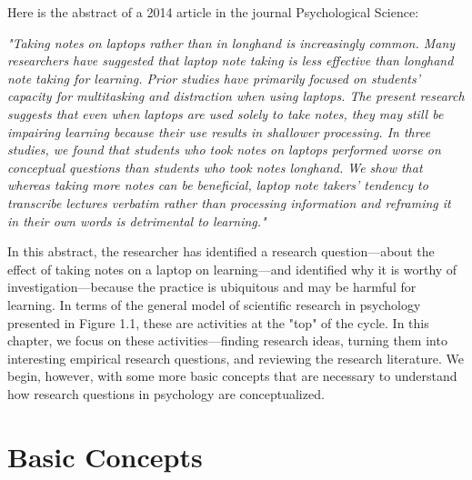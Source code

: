 

Here is the abstract of a 2014 article in the journal Psychological Science:

\emph{"Taking notes on laptops rather than in longhand is increasingly common. Many researchers have suggested that laptop note taking is less effective than longhand note taking for learning. Prior studies have primarily focused on students' capacity for multitasking and distraction when using laptops. The present research suggests that even when laptops are used solely to take notes, they may still be impairing learning because their use results in shallower processing. In three studies, we found that students who took notes on laptops performed worse on conceptual questions than students who took notes longhand. We show that whereas taking more notes can be beneficial, laptop note takers' tendency to transcribe lectures verbatim rather than processing information and reframing it in their own words is detrimental to learning."} \citep{mueller_pen_2014}

In this abstract, the researcher has identified a research question---about the effect of taking notes on a laptop on learning---and identified why it is worthy of investigation---because the practice is ubiquitous and may be harmful for learning. In terms of the general model of scientific research in psychology presented in Figure 1.1, these are activities at the "top" of the cycle. In this chapter, we focus on these activities---finding research ideas, turning them into interesting empirical research questions, and reviewing the research literature. We begin, however, with some more basic concepts that are necessary to understand how research questions in psychology are conceptualized.

\section{Basic Concepts}

